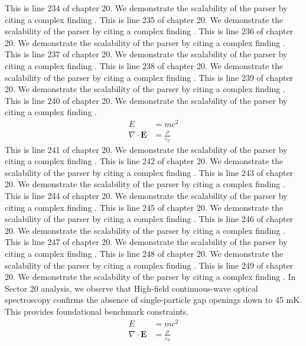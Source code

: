 This is line 234 of chapter 20. We demonstrate the scalability of the parser by citing a complex finding \cite{ref20_234}.
This is line 235 of chapter 20. We demonstrate the scalability of the parser by citing a complex finding \cite{ref20_235}.
This is line 236 of chapter 20. We demonstrate the scalability of the parser by citing a complex finding \cite{ref20_236}.
This is line 237 of chapter 20. We demonstrate the scalability of the parser by citing a complex finding \cite{ref20_237}.
This is line 238 of chapter 20. We demonstrate the scalability of the parser by citing a complex finding \cite{ref20_238}.
This is line 239 of chapter 20. We demonstrate the scalability of the parser by citing a complex finding \cite{ref20_239}.
This is line 240 of chapter 20. We demonstrate the scalability of the parser by citing a complex finding \cite{ref20_240}.
\begin{align*}
  E &= mc^2 \\
  \nabla \cdot \mathbf{E} &= \frac{\rho}{\varepsilon_0}
\end{align*}
This is line 241 of chapter 20. We demonstrate the scalability of the parser by citing a complex finding \cite{ref20_241}.
This is line 242 of chapter 20. We demonstrate the scalability of the parser by citing a complex finding \cite{ref20_242}.
This is line 243 of chapter 20. We demonstrate the scalability of the parser by citing a complex finding \cite{ref20_243}.
This is line 244 of chapter 20. We demonstrate the scalability of the parser by citing a complex finding \cite{ref20_244}.
This is line 245 of chapter 20. We demonstrate the scalability of the parser by citing a complex finding \cite{ref20_245}.
This is line 246 of chapter 20. We demonstrate the scalability of the parser by citing a complex finding \cite{ref20_246}.
This is line 247 of chapter 20. We demonstrate the scalability of the parser by citing a complex finding \cite{ref20_247}.
This is line 248 of chapter 20. We demonstrate the scalability of the parser by citing a complex finding \cite{ref20_248}.
This is line 249 of chapter 20. We demonstrate the scalability of the parser by citing a complex finding \cite{ref20_249}.
In Sector 20 analysis, we observe that High-field continuous-wave optical spectroscopy confirms the absence of single-particle gap openings down to 45 mK. This provides foundational benchmark constraints.
\begin{align*}
  E &= mc^2 \\
  \nabla \cdot \mathbf{E} &= \frac{\rho}{\varepsilon_0}
\end{align*}
